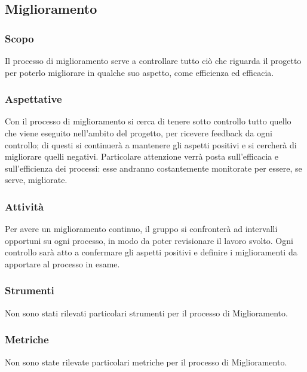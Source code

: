 \subsection{Miglioramento}
\subsubsection{Scopo}
Il processo di miglioramento serve a controllare tutto ciò che riguarda il progetto per poterlo migliorare in 
qualche suo aspetto, come efficienza ed efficacia.
\subsubsection{Aspettative}
Con il processo di miglioramento si cerca di tenere sotto controllo tutto quello che viene eseguito 
nell'ambito del progetto, per ricevere feedback da ogni controllo; di questi si continuerà a mantenere gli 
aspetti positivi e si cercherà di migliorare quelli negativi. Particolare attenzione verrà posta 
sull'efficacia e sull'efficienza dei processi: esse andranno costantemente monitorate per essere, se serve, 
migliorate.
\subsubsection{Attività}
Per avere un miglioramento continuo, il gruppo si confronterà ad intervalli opportuni su ogni processo, in 
modo da poter revisionare il lavoro svolto. Ogni controllo sarà atto a confermare gli aspetti positivi e 
definire i miglioramenti da apportare al processo in esame.

\subsubsection{Strumenti}
Non sono stati rilevati particolari strumenti per il processo di Miglioramento.
\subsubsection{Metriche} 
Non sono state rilevate particolari metriche per il processo di Miglioramento.